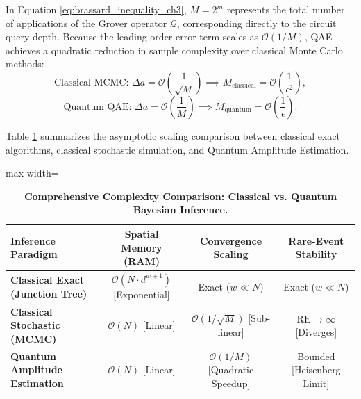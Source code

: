 In Equation \eqref{eq:brassard_inequality_ch3}, $M = 2^m$ represents the total number of applications of the Grover operator $\mathcal{Q}$, corresponding directly to the circuit query depth. Because the leading-order error term scales as $\mathcal{O}(1/M)$, QAE achieves a quadratic reduction in sample complexity over classical Monte Carlo methods:
\begin{equation}
\text{Classical MCMC: } \Delta a = \mathcal{O}\left(\frac{1}{\sqrt{M}}\right) \implies M_{\mathrm{classical}} = \mathcal{O}\left(\frac{1}{\epsilon^2}\right),
\label{eq:classical_sample_complexity_comparison}
\end{equation}
\begin{equation}
\text{Quantum QAE: } \Delta a = \mathcal{O}\left(\frac{1}{M}\right) \implies M_{\mathrm{quantum}} = \mathcal{O}\left(\frac{1}{\epsilon}\right).
\label{eq:quantum_sample_complexity_comparison}
\end{equation}

Table \ref{tab:algorithmic_complexity_comparison} summarizes the asymptotic scaling comparison between classical exact algorithms, classical stochastic simulation, and Quantum Amplitude Estimation.

\begin{table}[htbp]
\centering
\caption{\textbf{Comprehensive Complexity Comparison: Classical vs. Quantum Bayesian Inference.}}
\label{tab:algorithmic_complexity_comparison}
\begin{adjustbox}{max width=\textwidth}
\small
\begin{tabular}{lccc}
\toprule
\textbf{Inference Paradigm} & \textbf{Spatial Memory (RAM)} & \textbf{Convergence Scaling} & \textbf{Rare-Event Stability} \\
\midrule
\textbf{Classical Exact (Junction Tree)} & $\mathcal{O}(N \cdot d^{w+1})$ [Exponential] & Exact ($w \ll N$) & Exact ($w \ll N$) \\
\textbf{Classical Stochastic (MCMC)} & $\mathcal{O}(N)$ [Linear] & $\mathcal{O}(1/\sqrt{M})$ [Sub-linear] & $\mathrm{RE} \to \infty$ [Diverges] \\
\textbf{Quantum Amplitude Estimation} & $\mathcal{O}(N)$ [Linear] & $\mathcal{O}(1/M)$ [Quadratic Speedup] & Bounded [Heisenberg Limit] \\
\bottomrule
\end{tabular}
\end{adjustbox}
\end{table}

